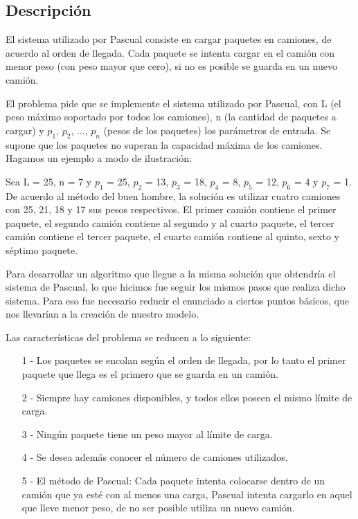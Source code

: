 \subsection{Descripci\'on}


El sistema utilizado por Pascual consiste en cargar paquetes en camiones, de acuerdo al orden de llegada. Cada paquete se intenta cargar en el cami\'on con menor peso (con peso mayor que cero), si no es posible se guarda en un nuevo cami\'on.

El problema pide que se implemente el sistema utilizado por Pascual, con L (el peso m\'aximo soportado por todos los camiones), n (la cantidad de paquetes a cargar) y $p_1$, $p_2$, ..., $p_n$ (pesos de los paquetes) los par\'ametros de entrada.  Se supone que los paquetes no superan la capacidad m\'axima de los camiones.
Hagamos un ejemplo a modo de ilustraci\'on:

Sea L = 25, n = 7 y $p_1$ = 25, $p_2$ = 13, $p_3$ = 18, $p_4$ = 8, $p_5$ = 12, $p_6$ = 4 y $p_7$ = 1.
De acuerdo al m\'etodo del buen hombre, la soluci\'on es utilizar cuatro camiones con 25, 21, 18 y 17 sus pesos respectivos. El primer cami\'on contiene el primer paquete, el segundo cami\'on contiene al segundo y al cuarto paquete, el tercer cami\'on contiene el tercer paquete, el cuarto cami\'on contiene al quinto, sexto y s\'eptimo paquete.

Para desarrollar un algoritmo que llegue a la misma soluci\'on que obtendr\'ia el sistema de Pascual, lo que hicimos fue seguir los mismos pasos que realiza dicho sistema. 
Para eso fue necesario reducir el enunciado a ciertos puntos b\'asicos, que nos llevar\'ian a la creaci\'on de nuestro modelo. 

Las caracter\'isticas del problema se reducen a lo siguiente:
\begin{itemize}
\item[1]- Los paquetes se encolan seg\'un el orden de llegada, por lo tanto el primer paquete que llega es el primero que se guarda en un cami\'on.
\item[2]- Siempre hay camiones disponibles, y todos ellos poseen el mismo l\'imite de carga.
\item[3]- Ning\'un paquete tiene un peso mayor al l\'imite de carga.
\item[4]- Se desea adem\'as conocer el n\'umero de camiones utilizados.
\item[5]- El m\'etodo de Pascual:
 Cada paquete intenta colocarse dentro de un cami\'on que ya est\'e con al menos una carga, Pascual intenta cargarlo en aquel que lleve menor peso, de no ser posible utiliza un nuevo cami\'on.
\end{itemize}